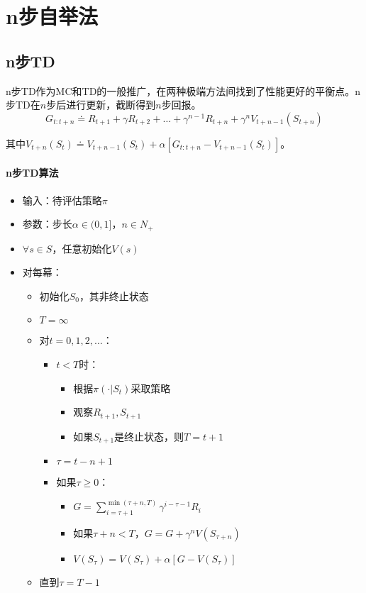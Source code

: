 \documentclass[
12pt, %
a4paper, 
oneside, %
headinclude,footinclude, %
]{scrartcl}
\begin{document}
\section{n步自举法}
\subsection{n步TD}
n步TD作为MC和TD的一般推广，在两种极端方法间找到了性能更好的平衡点。n步TD在$ n $步后进行更新，截断得到$ n $步回报。
$$ G_{t:t + n} \doteq R_{t + 1} + \gamma R_{t + 2} + \dots + \gamma^{n - 1} R_{t + n} + \gamma^n V_{t + n - 1}(S_{t + n}) $$

其中$ V_{t + n}(S_t) \doteq V_{t + n - 1}(S_t) + \alpha[G_{t:t + n} - V_{t + n - 1}(S_t)] $。
\paragraph{n步TD算法}
\begin{itemize}
\item 输入：待评估策略$ \pi $
\item 参数：步长$ \alpha \in (0,1] $，$ n \in N_+ $
\item $ \forall s \in S $，任意初始化$ V(s) $
\item 对每幕：
\begin{itemize}
\item 初始化$ S_0 $，其非终止状态
\item $ T = \infty $
\item 对$ t = 0, 1, 2, \dots $：
\begin{itemize}
\item $ t < T $时：
\begin{itemize}
\item 根据$ \pi(\cdot|S_t) $采取策略
\item 观察$ R_{t + 1}, S_{t + 1} $
\item 如果$ S_{t + 1} $是终止状态，则$ T = t + 1 $
\end{itemize}
\item $ \tau = t - n + 1 $
\item 如果$ \tau \geq 0 $：
\begin{itemize}
\item $ G = \sum_{i = \tau + 1}^{\min(\tau + n, T)} \gamma^{i - \tau - 1}R_i $
\item 如果$ \tau + n < T $，$ G = G + \gamma^n V(S_{\tau + n}) $
\item $ V(S_{\tau}) = V(S_{\tau}) + \alpha[G - V(S_{\tau})] $
\end{itemize}
\end{itemize}
\item 直到$ \tau = T - 1 $
\end{itemize}
\end{itemize}
\end{document}
